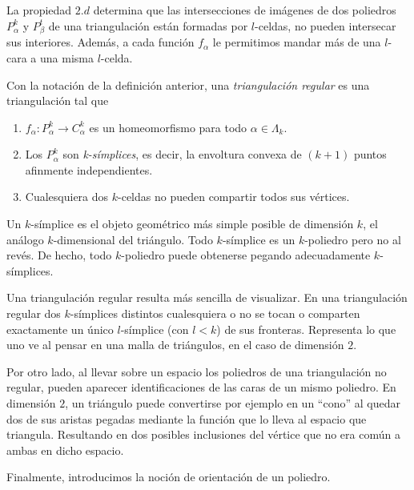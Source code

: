 La propiedad $2.d$ determina que las intersecciones de imágenes de dos poliedros $P^k_{\alpha}$ y $P^t_{\beta}$ de una triangulación están formadas por $l$-celdas, no pueden intersecar sus interiores. Además, a cada función $f_{\alpha}$ le permitimos mandar más de una $l$-cara a una misma $l$-celda.


\bigskip

\begin{definition}
    Con la notación de la definición anterior, una \textit{triangulación regular} es una triangulación tal que
    \begin{enumerate}
        \item $f_{\alpha}: P^k_{\alpha} \to C^k_{\alpha}$ es un homeomorfismo para todo $\alpha\in\Lambda_k$.
        \item Los $P^k_{\alpha}$ son \textit{k-símplices}, es decir, la envoltura convexa de $(k+1)$ puntos afinmente independientes.
        \item Cualesquiera dos $k$-celdas no pueden compartir todos sus vértices.
    \end{enumerate}
\end{definition}

\begin{remark}
    Un $k$-símplice es el objeto geométrico más simple posible de dimensión $k$, el análogo $k$-dimensional del triángulo. Todo $k$-símplice es un $k$-poliedro pero no al revés. De hecho, todo $k$-poliedro puede obtenerse pegando adecuadamente $k$-símplices.
\end{remark}

\bigskip

Una triangulación regular resulta más sencilla de visualizar. En una triangulación regular dos $k$-símplices distintos cualesquiera o no se tocan o comparten exactamente un único $l$-símplice (con $l<k$) de sus fronteras. Representa lo que uno ve al pensar en una malla de triángulos, en el caso de dimensión $2$. 

Por otro lado, al llevar sobre un espacio los poliedros de una triangulación no regular, pueden aparecer identificaciones de las caras de un mismo poliedro. En dimensión $2$, un triángulo puede convertirse por ejemplo en un ``cono'' al quedar dos de sus aristas pegadas mediante la función que lo lleva al espacio que triangula. Resultando en dos posibles inclusiones del vértice que no era común a ambas en dicho espacio.

\bigskip

Finalmente, introducimos la noción de orientación de un poliedro.

